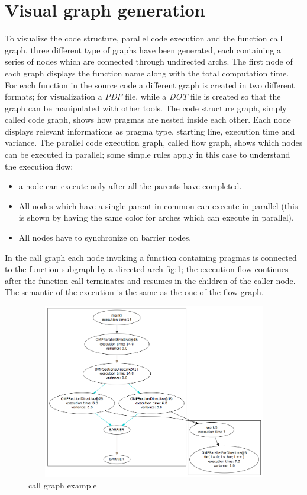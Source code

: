 \documentclass[a4paper,11pt,oneside]{book}
\begin{document}
\section{Visual graph generation}

To visualize the code structure, parallel code execution and the function call graph, three different type of graphs have been generated, each containing a series of nodes which are connected through undirected archs. The first node of each graph displays the function name along with the total computation time. For each function in the source code a different graph is created in two different formats; for visualization a \emph{PDF} file, while a \emph{DOT} file is created so that the graph can be manipulated with other tools. The code structure graph, simply called code graph, shows how pragmas are nested inside each other. Each node displays relevant informations as pragma type, starting line, execution time and variance. The parallel code execution graph, called flow graph, shows which nodes can be executed in parallel; some simple rules apply in this case to understand the execution flow:
\begin{itemize}
\item{a node can execute only after all the parents have completed.}
\item{All nodes which have a single parent in common can execute in parallel (this is shown by having the same color for arches which can execute in parallel).}
\item{All nodes have to synchronize on barrier nodes.}
\end{itemize}
In the call graph each node invoking a function containing pragmas is connected to the function subgraph by a directed arch fig:\ref{call_graph}; the execution flow continues after the function call terminates and resumes in the children of the caller node. The semantic of the execution is the same as the one of the flow graph.

\begin{figure}[H]
\centering
\includegraphics[width = 130mm, height = 76mm]{call_graph.png}
\caption{call graph example}
\label{call_graph}
\end{figure}
\end{document}
